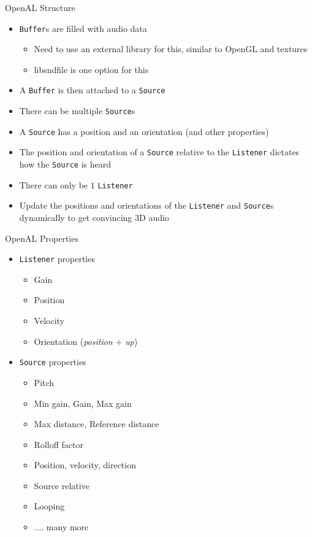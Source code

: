 \documentclass{beamer}
\begin{document}
\begin{frame}[fragile]{OpenAL Structure}
    \begin{itemize}
        \item {\color{blue}\verb"Buffer"}s are filled with audio data
        \begin{itemize}
            \item Need to use an external library for this, similar to OpenGL and textures
            \item libsndfile is one option for this
        \end{itemize}
        \item A {\color{blue}\verb"Buffer"} is then attached to a {\color{blue}\verb"Source"}
        \item There can be multiple {\color{blue}\verb"Source"}s
        \item A {\color{blue}\verb"Source"} has a position and an orientation (and other properties)
        \item The position and orientation of a {\color{blue}\verb"Source"} relative to the {\color{blue}
            \verb"Listener"} dictates how the {\color{blue}\verb"Source"} is heard
        \item There can only be $1$ {\color{blue}\verb"Listener"}
        \item Update the positions and orientations of the {\color{blue}\verb"Listener"} and
            {\color{blue}\verb"Source"}s dynamically to get convincing 3D audio
    \end{itemize}
\end{frame}

\begin{frame}[fragile]{OpenAL Properties}
    \begin{itemize}
        \item {\color{blue}\verb"Listener"} properties
        \begin{itemize}
            \item Gain
            \item Position
            \item Velocity
            \item Orientation (\emph{position} $+$ \emph{up})
        \end{itemize}
        \item {\color{blue}\verb"Source"} properties
        \begin{itemize}
            \item Pitch
            \item Min gain, Gain, Max gain
            \item Max distance, Reference distance
            \item Rolloff factor
            \item Position, velocity, direction
            \item Source relative
            \item Looping
            \item .... many more
        \end{itemize}
    \end{itemize}
\end{frame}
\end{document}
